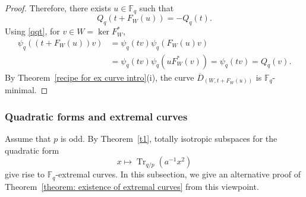 \documentclass[12pt,a4paper]{amsart}
\theoremstyle{definition}
\def\F{{\mathbb F}}
\theoremstyle{remark}
\DeclareMathOperator{\Tr}{Tr}
\begin{document}
\begin{proof}
Therefore, there exists $u \in \F_q$ such that 
\[
Q_q(t + F_W(u)) = - Q_q(t).
\]
Using \eqref{qqt}, for $v \in W=\ker F_W^\ast$, 
\begin{align*}
\psi_q((t+F_W(u))v)&=\psi_q(tv) \psi_q(F_W(u) v)\\
&=\psi_q(tv)\psi_q(u F_W^\ast(v))=\psi_q(tv)=Q_q(v). 
\end{align*}
By Theorem~\ref{recipe for ex curve intro}(i), the curve $\overline{D}_{(W,t+F_W(u))}$ is $\F_q$-minimal. 
\end{proof}

\subsubsection{Quadratic forms and extremal curves}
Assume that $p$ is odd. By Theorem~\ref{t1}, totally isotropic
subspaces for the quadratic form
\[
x\mapsto \Tr_{q/p}(a^{-1}x^2)
\]
give rise to $\F_q$-extremal curves.  In this subsection, we give an alternative proof of Theorem~\ref{theorem: existence of extremal curves} from this viewpoint. 
\end{document}

